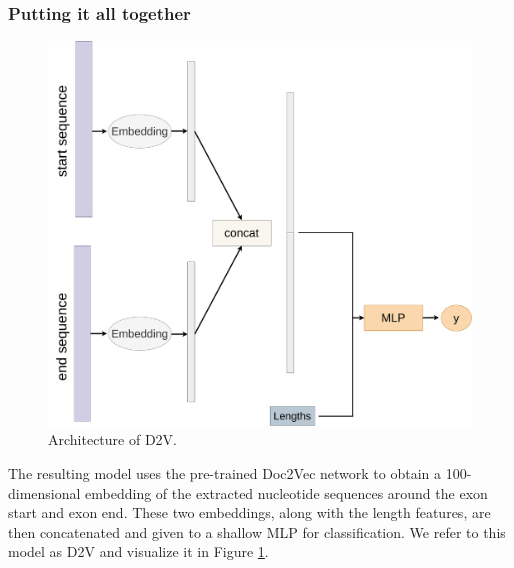 \subsubsection{Putting it all together} \label{subsubsec:d2vinference}

\begin{figure}
	\includegraphics[width=1\textwidth]{../visualizations/ch4-methods/d2v.pdf} 	
	\caption{
		Architecture of D2V. 
	}
	\label{fig:d2v_arch}
\end{figure}

The resulting model uses the pre-trained Doc2Vec network to obtain a 100-dimensional embedding of the extracted nucleotide sequences around the exon start and exon end. These two embeddings, along with the length features, are then concatenated and given to a shallow MLP for classification. We refer to this model as D2V and visualize it in Figure \ref{fig:d2v_arch}. 








